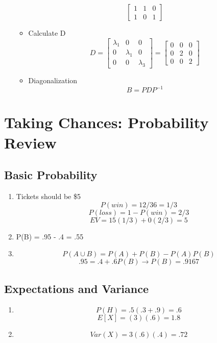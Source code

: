\documentclass{article}
\begin{document}
\begin{itemize}
\begin{itemize}
\[\begin{bmatrix}
                    1 & 1  & 0  \\
                    1 & 0  & 1
                \end{bmatrix}
            \]
            \item Calculate D
            \[ D = 
                \begin{bmatrix}
                    \lambda_1 & 0 & 0 \\ 
                    0 & \lambda_1 & 0 \\ 
                    0 & 0 & \lambda_3
                \end{bmatrix} =
                \begin{bmatrix}
                    0 & 0 & 0 \\ 
                    0 & 2 & 0 \\ 
                    0 & 0 & 2
                \end{bmatrix}
            \]
            \item Diagonalization
            \[
                B = PDP^{-1}
            \]
        \end{itemize}
\end{itemize}

\section{Taking Chances: Probability Review}
\subsection{Basic Probability}
\begin{enumerate}
    \item Tickets should be \$5
    \[
        P(win) = 12/36 = 1/3
    \]
    \[
        P(loss) = 1 - P(win) = 2/3
    \]
    \[
        EV = 15(1/3) + 0(2/3) = 5
    \]
    \item P(B) = .95 - .4 = .55
    \item 
    \[
        P(A \cup B) = P(A) + P(B) - P(A)P(B)
    \]
    \[
        .95 = .4 + .6 P(B) \longrightarrow P(B) = .9167
    \]
\end{enumerate}

\subsection{Expectations and Variance}
\begin{enumerate}
    \item 
    \[
        P(H) = .5 (.3+.9) = .6
    \]
    \[
        E[X] = (3)(.6) = 1.8
    \]
    \item 
    \[
        Var(X) = 3(.6)(.4) = .72
    \]
\end{enumerate}
\end{document}
